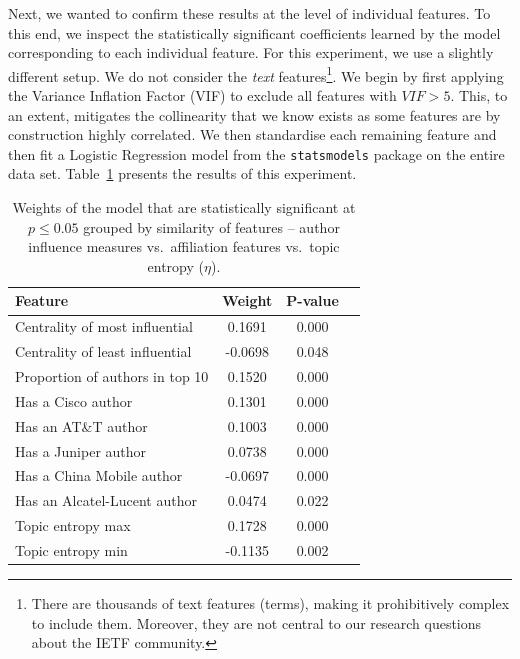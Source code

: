 \documentclass[twocolumn,10pt]{article}
\begin{document}
Next, we wanted to confirm these results at the level of individual
features. To this end, we inspect the statistically significant
coefficients learned by the model corresponding to each individual feature.
For this experiment, we use a slightly different setup. We do not consider
the \emph{text} features\footnote{There are thousands of text features
(terms), making it prohibitively complex to include them. Moreover, they
are not central to our research questions about the IETF community.}. We
begin by first applying the Variance Inflation Factor (VIF) to exclude all
features with $\mathit{VIF} > 5$. This, to an extent, mitigates the
collinearity that we know exists as some features are by construction
highly correlated. We then standardise each remaining feature and then fit
a Logistic Regression model from the \texttt{statsmodels} package
\cite{seabold2010statsmodels} on the entire data set.
Table~\ref{tbl:resstat} presents the results of this experiment.

\renewcommand{\tabcolsep}{0.3cm}
\begin{table}
  \centering
  \begin{tabular}{lccc}
    \toprule
      Feature       & Weight  & P-value \\
    \midrule
      Centrality of most influential  & 0.1691 &   0.000 \\
      Centrality of least influential & -0.0698 &  0.048 \\
      Proportion of authors in top 10  & 0.1520 &  0.000 \\
    \midrule
      Has a Cisco author  & 0.1301 &  0.000 \\
      Has an AT\&T author  & 0.1003 &  0.000 \\
      Has a Juniper author  & 0.0738 &  0.000 \\
      Has a China Mobile author & -0.0697  & 0.000 \\
      Has an Alcatel-Lucent author  & 0.0474 &  0.022 \\
    \midrule
      Topic entropy max & 0.1728 & 0.000 \\
      Topic entropy min & -0.1135 &  0.002 \\
    \bottomrule
  \end{tabular}
  \caption{
    Weights of the model that are statistically significant at $p \leq 0.05$
    grouped by similarity of features -- author influence measures vs.\
    affiliation features vs.\ topic entropy ($\eta$).
  }
  \label{tbl:resstat}
\end{table}
\end{document}
